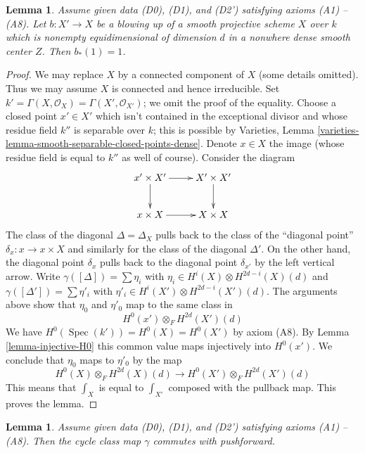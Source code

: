 \documentclass{stacks-project}
\theoremstyle{plain}
\newtheorem{lemma}[subsection]{Lemma}
\theoremstyle{definition}
\theoremstyle{remark}
\numberwithin{equation}{subsection}
\def\Spec{\mathop{\mathrm{Spec}}}
\begin{document}
\begin{lemma}
\label{lemma-pushforward-blowup}
Assume given data (D0), (D1), and (D2') satisfying axioms (A1) -- (A8).
Let $b : X' \to X$ be a blowing up of a smooth projective scheme $X$
over $k$ which is nonempty equidimensional of dimension $d$
in a nonwhere dense smooth center $Z$. Then $b_*(1) = 1$.
\end{lemma}

\begin{proof}
We may replace $X$ by a connected component of $X$ (some details
omitted). Thus we may assume $X$ is connected and hence irreducible.
Set $k' = \Gamma(X, \mathcal{O}_X) = \Gamma(X', \mathcal{O}_{X'})$;
we omit the proof of the equality. Choose a closed point $x' \in X'$
which isn't contained in the exceptional divisor and whose residue field
$k''$ is separable over $k$; this is possible by
Varieties, Lemma \ref{varieties-lemma-smooth-separable-closed-points-dense}.
Denote $x \in X$ the image (whose residue field is equal to $k''$
as well of course). Consider the diagram
$$
\xymatrix{
x' \times X' \ar[r] \ar[d] & X' \times X' \ar[d] \\
x \times X \ar[r] & X \times X
}
$$
The class of the diagonal $\Delta = \Delta_X$ pulls back to the class of the
``diagonal point'' $\delta_x : x \to x \times X$ and similarly for the class of
the diagonal $\Delta'$. On the other hand, the diagonal point $\delta_x$
pulls back to the diagonal point $\delta_{x'}$ by the left vertical arrow.
Write $\gamma([\Delta]) = \sum \eta_i$ with
$\eta_i \in H^i(X) \otimes H^{2d - i}(X)(d)$ and
$\gamma([\Delta']) = \sum \eta'_i$ with
$\eta'_i \in H^i(X') \otimes H^{2d - i}(X')(d)$.
The arguments above show that $\eta_0$ and $\eta'_0$ map to the same
class in
$$
H^0(x') \otimes_F H^{2d}(X')(d)
$$
We have $H^0(\Spec(k')) = H^0(X) = H^0(X')$ by axiom (A8).
By Lemma \ref{lemma-injective-H0} this common value maps injectively
into $H^0(x')$. We conclude that $\eta_0$ maps to $\eta'_0$ by the map
$$
H^0(X) \otimes_F H^{2d}(X)(d)
\longrightarrow
H^0(X') \otimes_F H^{2d}(X')(d)
$$
This means that $\int_X$ is equal to $\int_{X'}$ composed with
the pullback map. This proves the lemma.
\end{proof}

\begin{lemma}
\label{lemma-done}
Assume given data (D0), (D1), and (D2') satisfying axioms (A1) -- (A8).
Then the cycle class map $\gamma$ commutes with pushforward.
\end{lemma}
\end{document}
